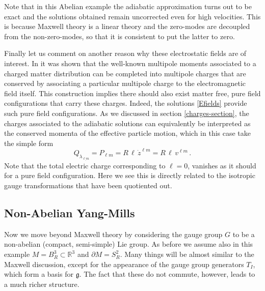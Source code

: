 \documentclass[11pt,a4paper]{article}
\def\ulm{{\underline{\ell m}}}
\begin{document}
          	Note that in this Abelian example the adiabatic approximation turns out to be exact and the solutions obtained remain uncorrected even for high velocities. This is because Maxwell theory is a linear theory and the zero-modes are decoupled from the non-zero-modes, so that it is consistent to put the latter to zero.
          	
          	Finally let us comment on another reason why these electrostatic fields are of interest. In \cite{Seraj:2016jxi} it was shown that the well-known multipole moments associated to a charged matter distribution can be completed into multipole charges that are conserved by associating a particular multipole charge to the electromagnetic field itself. This construction implies there should also exist matter free, pure field configurations that carry these charges. Indeed, the solutions \eqref{Efields} provide such pure field configurations. As we discussed in section \ref{charges-section}, the charges associated to the adiabatic solutions can equivalently be interpreted as the conserved momenta of the effective particle motion, which in this case take the simple form
          	\begin{equation}
          		Q_{\lambda_\ulm}=P_{\ell m}=R\,\ell\, \dot z^{\ell m}=R\,\ell\, v^{\ell m}  \,.
          	\end{equation}
          	Note that the total electric charge corresponding to $\ell=0$,  vanishes as it should for a pure field configuration. Here we see this is directly related to the isotropic gauge transformations that have been quotiented out.
          	

    \subsection{Non-Abelian Yang-Mills}
    Now we move beyond Maxwell theory by considering the gauge group $G$ to be a non-abelian (compact, semi-simple) Lie group. As before we assume also in this example $M=B_R^3\subset\mathbb{R}^3$ and $\partial M=S_R^2$. Many things will be almost similar to the Maxwell discussion, except for the appearance of the gauge group generators $T_I$, which form a basis for $\mathfrak{g}$. The fact that these do not commute, however, leads to a much richer structure. 
    
\end{document}

